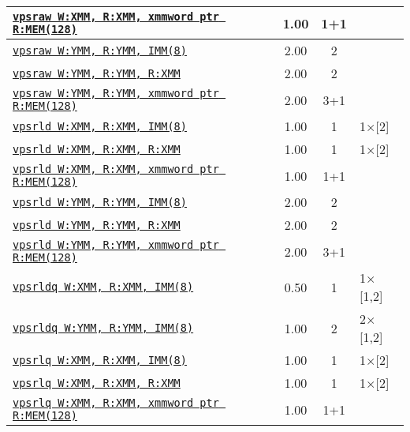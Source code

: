 \documentclass[a4paper,english,fontsize=9]{scrartcl}
\begin{document}
\begin{longtable}{p{}ccL{.25\textwidth}}
  \midrule
  \texttt{\href{https://felixcloutier.com/x86/PSRAW:PSRAD:PSRAQ.html}{vpsraw W:XMM, R:XMM, xmmword ptr R:MEM(128)}} & 1.00 & 1+1 &  \\
  \midrule
  \texttt{\href{https://felixcloutier.com/x86/PSRAW:PSRAD:PSRAQ.html}{vpsraw W:YMM, R:YMM, IMM(8)}} & 2.00 & 2 &  \\
  \midrule
  \texttt{\href{https://felixcloutier.com/x86/PSRAW:PSRAD:PSRAQ.html}{vpsraw W:YMM, R:YMM, R:XMM}} & 2.00 & 2 &  \\
  \midrule
  \texttt{\href{https://felixcloutier.com/x86/PSRAW:PSRAD:PSRAQ.html}{vpsraw W:YMM, R:YMM, xmmword ptr R:MEM(128)}} & 2.00 & 3+1 &  \\
  \midrule
  \texttt{\href{https://felixcloutier.com/x86/PSRLW:PSRLD:PSRLQ.html}{vpsrld W:XMM, R:XMM, IMM(8)}} & 1.00 & 1 & 1\(\times\)[2] \\
  \midrule
  \texttt{\href{https://felixcloutier.com/x86/PSRLW:PSRLD:PSRLQ.html}{vpsrld W:XMM, R:XMM, R:XMM}} & 1.00 & 1 & 1\(\times\)[2] \\
  \midrule
  \texttt{\href{https://felixcloutier.com/x86/PSRLW:PSRLD:PSRLQ.html}{vpsrld W:XMM, R:XMM, xmmword ptr R:MEM(128)}} & 1.00 & 1+1 &  \\
  \midrule
  \texttt{\href{https://felixcloutier.com/x86/PSRLW:PSRLD:PSRLQ.html}{vpsrld W:YMM, R:YMM, IMM(8)}} & 2.00 & 2 &  \\
  \midrule
  \texttt{\href{https://felixcloutier.com/x86/PSRLW:PSRLD:PSRLQ.html}{vpsrld W:YMM, R:YMM, R:XMM}} & 2.00 & 2 &  \\
  \midrule
  \texttt{\href{https://felixcloutier.com/x86/PSRLW:PSRLD:PSRLQ.html}{vpsrld W:YMM, R:YMM, xmmword ptr R:MEM(128)}} & 2.00 & 3+1 &  \\
  \midrule
  \texttt{\href{https://felixcloutier.com/x86/PSRLDQ.html}{vpsrldq W:XMM, R:XMM, IMM(8)}} & 0.50 & 1 & 1\(\times\)[1,2] \\
  \midrule
  \texttt{\href{https://felixcloutier.com/x86/PSRLDQ.html}{vpsrldq W:YMM, R:YMM, IMM(8)}} & 1.00 & 2 & 2\(\times\)[1,2] \\
  \midrule
  \texttt{\href{https://felixcloutier.com/x86/PSRLW:PSRLD:PSRLQ.html}{vpsrlq W:XMM, R:XMM, IMM(8)}} & 1.00 & 1 & 1\(\times\)[2] \\
  \midrule
  \texttt{\href{https://felixcloutier.com/x86/PSRLW:PSRLD:PSRLQ.html}{vpsrlq W:XMM, R:XMM, R:XMM}} & 1.00 & 1 & 1\(\times\)[2] \\
  \midrule
  \texttt{\href{https://felixcloutier.com/x86/PSRLW:PSRLD:PSRLQ.html}{vpsrlq W:XMM, R:XMM, xmmword ptr R:MEM(128)}} & 1.00 & 1+1 &  \\

\end{longtable}
\end{document}
